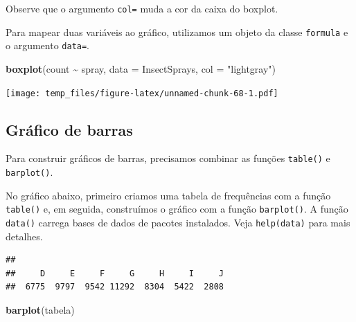 \documentclass[
]{book}
\newenvironment{Shaded}{\begin{snugshade}}{\end{snugshade}}
\newcommand{\DataTypeTok}[1]{\textcolor[rgb]{0.13,0.29,0.53}{#1}}
\newcommand{\KeywordTok}[1]{\textcolor[rgb]{0.13,0.29,0.53}{\textbf{#1}}}
\newcommand{\NormalTok}[1]{#1}
\newcommand{\OperatorTok}[1]{\textcolor[rgb]{0.81,0.36,0.00}{\textbf{#1}}}
\newcommand{\StringTok}[1]{\textcolor[rgb]{0.31,0.60,0.02}{#1}}
\begin{document}
Observe que o argumento \texttt{col=} muda a cor da caixa do boxplot.

Para mapear duas variáveis ao gráfico, utilizamos um objeto da classe \texttt{formula} e o argumento \texttt{data=}.

\begin{Shaded}
\begin{Highlighting}[]
\KeywordTok{boxplot}\NormalTok{(count }\OperatorTok{\textasciitilde{}}\StringTok{ }\NormalTok{spray, }\DataTypeTok{data =}\NormalTok{ InsectSprays, }\DataTypeTok{col =} \StringTok{"lightgray"}\NormalTok{)}
\end{Highlighting}
\end{Shaded}

\texttt{[image: temp\_files/figure-latex/unnamed-chunk-68-1.pdf]}

\hypertarget{gruxe1fico-de-barras}{%
\subsection{Gráfico de barras}\label{gruxe1fico-de-barras}}

Para construir gráficos de barras, precisamos combinar as funções \texttt{table()} e \texttt{barplot()}.

No gráfico abaixo, primeiro criamos uma tabela de frequências com a função \texttt{table()} e, em seguida, construímos o gráfico com a função \texttt{barplot()}. A função \texttt{data()} carrega bases de dados de pacotes instalados. Veja \texttt{help(data)} para mais detalhes.

\begin{Shaded}
\end{Shaded}

\begin{verbatim}
## 
##     D     E     F     G     H     I     J 
##  6775  9797  9542 11292  8304  5422  2808
\end{verbatim}

\begin{Shaded}
\begin{Highlighting}[]
\KeywordTok{barplot}\NormalTok{(tabela)}
\end{Highlighting}
\end{Shaded}
\end{document}
